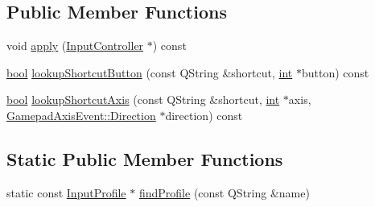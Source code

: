\subsection*{Public Member Functions}
\begin{DoxyCompactItemize}
\item 
void \mbox{\hyperlink{class_q_g_b_a_1_1_input_profile_af9d99ee2824bfd7fded95f73533d7f67}{apply}} (\mbox{\hyperlink{class_q_g_b_a_1_1_input_controller}{Input\+Controller}} $\ast$) const
\item 
\mbox{\hyperlink{libretro_8h_a4a26dcae73fb7e1528214a068aca317e}{bool}} \mbox{\hyperlink{class_q_g_b_a_1_1_input_profile_aa1db0602f8f404d2f5a6d0ae29445326}{lookup\+Shortcut\+Button}} (const Q\+String \&shortcut, \mbox{\hyperlink{ioapi_8h_a787fa3cf048117ba7123753c1e74fcd6}{int}} $\ast$button) const
\item 
\mbox{\hyperlink{libretro_8h_a4a26dcae73fb7e1528214a068aca317e}{bool}} \mbox{\hyperlink{class_q_g_b_a_1_1_input_profile_afd26d290f09ffc81d3f0502f8d741efa}{lookup\+Shortcut\+Axis}} (const Q\+String \&shortcut, \mbox{\hyperlink{ioapi_8h_a787fa3cf048117ba7123753c1e74fcd6}{int}} $\ast$axis, \mbox{\hyperlink{class_q_g_b_a_1_1_gamepad_axis_event_a5d50ab74dce4e58252f2affb5f227bbc}{Gamepad\+Axis\+Event\+::\+Direction}} $\ast$direction) const
\end{DoxyCompactItemize}
\subsection*{Static Public Member Functions}
\begin{DoxyCompactItemize}
\item 
static const \mbox{\hyperlink{class_q_g_b_a_1_1_input_profile}{Input\+Profile}} $\ast$ \mbox{\hyperlink{class_q_g_b_a_1_1_input_profile_ac6eae13b93ba25478a13e3a5cac69b46}{find\+Profile}} (const Q\+String \&name)
\end{DoxyCompactItemize}
